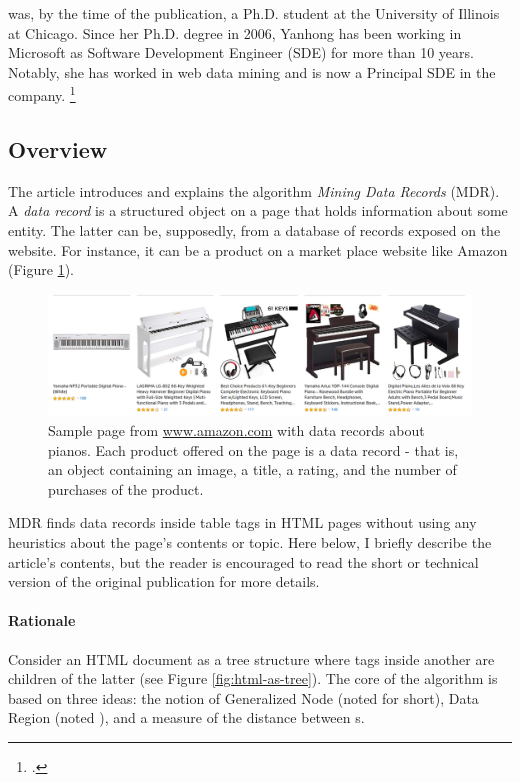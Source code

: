 \documentclass[10pt]{article}
\newcommand{\gn}{\path{GNode}}
\newcommand{\dr}{\path{DataRegion}}
\newcommand{\citefootnote}[1]{\footnote{\cite{#1}.}}
\begin{document}
was, by the time of the publication, a Ph.D. student at the University of Illinois at Chicago. Since her Ph.D. degree in 2006, Yanhong has been working in Microsoft as Software Development Engineer (SDE) for more than 10 years. Notably, she has worked in web data mining and is now a Principal SDE in the company. \citefootnote{yanhong-page, yanhong-linkedin}



\subsection{Overview}

The article introduces and explains the algorithm \emph{Mining Data Records} (MDR). A \emph{data record} is a structured object on a page that holds information about some entity. The latter can be, supposedly, from a database of records exposed on the website. For instance, it can be a product on a market place website like Amazon (Figure \ref{fig:pianos}).

\begin{figure}[!t]
  \includegraphics[width=0.9\linewidth]{fig/pianos.png}
  \caption{Sample page from \href{www.amazon.com}{www.amazon.com} with data records about pianos. Each product offered on the page is a data record - that is, an object containing an image, a title, a rating, and the number of purchases of the product.}
  \label{fig:pianos}
\end{figure}

MDR finds data records inside table tags in HTML pages without using any heuristics about the page's contents or topic. Here below, I briefly describe the article's contents, but the reader is encouraged to read the short \citep{mdr} or technical \citep{mdr-technical} version of the original publication for more details.

\paragraph{Rationale}

Consider an HTML document as a tree structure where tags inside another are children of the latter (see Figure \ref{fig:html-as-tree}). The core of the algorithm is based on three ideas: the notion of Generalized Node (noted \gn{} for short), Data Region (noted \dr{}), and a measure of the distance between \gn{}s. 
\end{document}
